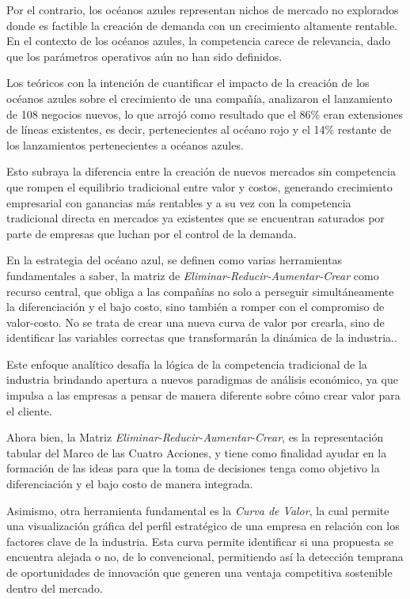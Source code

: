 Por el contrario, los océanos azules representan nichos de mercado no explorados donde es factible la creación de demanda con un crecimiento altamente rentable. En el contexto de los océanos azules, la competencia carece de relevancia, dado que los parámetros operativos aún no han sido definidos.

Los teóricos con la intención de cuantificar el impacto de la creación de los océanos azules sobre el crecimiento de una compañía, analizaron el lanzamiento de 108 negocios nuevos, lo que arrojó como resultado que el 86\% eran extensiones de líneas existentes, es decir, pertenecientes al océano rojo y el 14\% restante de los lanzamientos pertenecientes a océanos azules.

Esto subraya la diferencia entre la creación de nuevos mercados sin competencia que rompen el equilibrio tradicional entre valor y costos, generando crecimiento empresarial con ganancias más rentables y a su vez con la competencia tradicional directa en mercados ya existentes que se encuentran saturados por parte de empresas que luchan por el control de la demanda.

En la estrategia del océano azul, se definen como varias herramientas fundamentales a saber, la matriz de \emph{Eliminar-Reducir-Aumentar-Crear} como recurso central, que \guillemotleft obliga a las compañías no solo a perseguir simultáneamente la diferenciación y el bajo costo, sino también a romper con el compromiso de valor-costo. No se trata de crear una nueva curva de valor por crearla, sino de identificar las variables correctas que transformarán la dinámica de la industria.\guillemotright \parencite{kim2015estrategia}.

Este enfoque analítico desafía la lógica de la competencia tradicional de la industria brindando apertura a nuevos paradigmas de análisis económico, ya que impulsa a las empresas a pensar de manera diferente sobre cómo crear valor para el cliente. 

Ahora bien, la Matriz \emph{Eliminar-Reducir-Aumentar-Crear}, es la representación tabular del Marco de las Cuatro Acciones, y tiene como finalidad ayudar en la formación de las ideas para que la toma de decisiones tenga como objetivo la diferenciación y el bajo costo de manera integrada.

Asimismo, otra herramienta fundamental es la \emph{Curva de Valor}, la cual permite una visualización gráfica del perfil estratégico de una empresa en relación con los factores clave de la industria. Esta curva permite identificar si una propuesta se encuentra alejada o no, de lo convencional, permitiendo así la detección temprana de oportunidades de innovación que generen una ventaja competitiva sostenible dentro del mercado.


